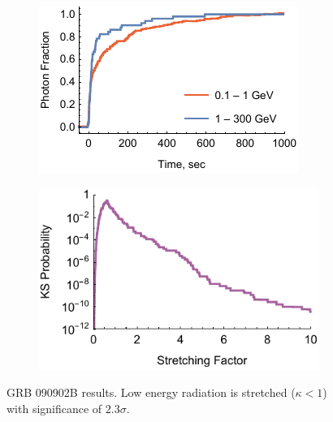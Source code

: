\documentclass{article}
\begin{document}
\begin{figure}
        \centering
        \begin{subfigure}{0.49\textwidth}
                \includegraphics[width=\textwidth]{lightCurve090902B}
                \label{fig:lightCurve090902B}
        \end{subfigure}
        \begin{subfigure}{0.49\textwidth}
                \includegraphics[width=\textwidth]{probabilities090902B}
                \label{fig:probabilities090902B}
        \end{subfigure}
        \caption{GRB 090902B results. Low energy radiation is stretched ($\kappa < 1$) with significance of $2.3\sigma$.}
        \label{fig:grb090902B}
\end{figure}
\end{document}
